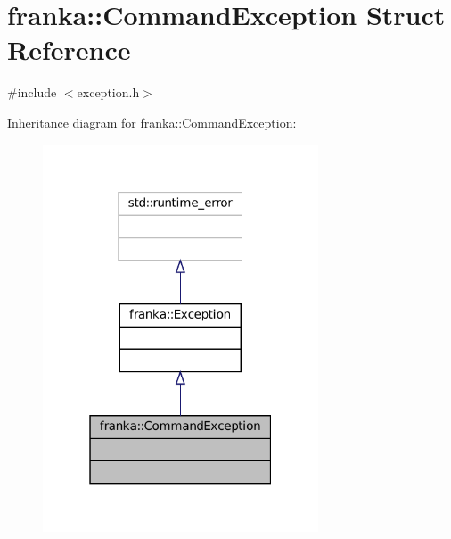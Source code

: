 \hypertarget{structfranka_1_1CommandException}{}\section{franka\+:\+:Command\+Exception Struct Reference}
\label{structfranka_1_1CommandException}


{\ttfamily \#include $<$exception.\+h$>$}



Inheritance diagram for franka\+:\+:Command\+Exception\+:
\nopagebreak
\begin{figure}[H]
\begin{center}
\leavevmode
\includegraphics[width=232pt]{structfranka_1_1CommandException__inherit__graph}
\end{center}
\end{figure}


